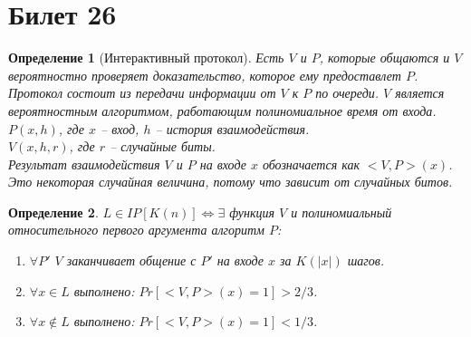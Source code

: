\documentclass[12pt, letterpaper]{article}
\newtheorem{defi}{Определение}[section]
\begin{document}
\section{Билет 26}
\begin{defi}[Интерактивный протокол]
Есть $V$ и $P$, которые общаются и $V$ вероятностно проверяет доказательство, которое ему предоставлет $P$. Протокол состоит из передачи информации от $V$ к $P$ по очереди. $V$ является вероятностным алгоритмом, работающим полиномиальное время от входа.\\
$P(x,h)$, где $x$ -- вход, $h$ -- история взаимодействия.\\
$V(x, h, r)$, где $r$ -- случайные биты.\\
Результат взаимодействия $V$ и $P$ на входе $x$ обозначается как $<V, P>(x)$. Это некоторая случайная величина, потому что зависит от случайных битов.
\end{defi}

\begin{defi}
$L \in IP[K(n)] \Longleftrightarrow \exists$ функция $V$ и полиномиальный относительного первого аргумента алгоритм $P$:\begin{enumerate}
\item $\forall P'$ $V$ заканчивает общение с $P'$ на входе $x$ за $K(|x|)$ шагов.
\item $\forall x \in L$ выполнено: $Pr[<V, P>(x)=1] > 2/3$. 
\item $\forall x \notin L$ выполнено: $Pr[<V, P>(x)=1] < 1/3$.
\end{enumerate}
\end{defi}
\end{document}

